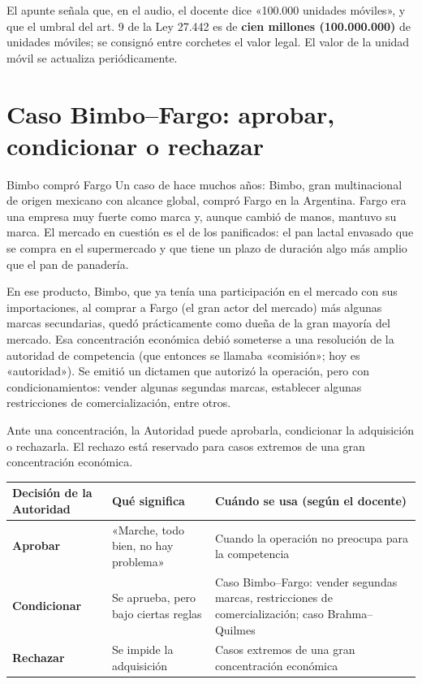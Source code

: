 \documentclass[12pt,oneside]{book}
\begin{document}
\begin{note}
El apunte señala que, en el audio, el docente dice «100.000 unidades móviles», y que el umbral del art. 9 de la Ley 27.442 es de \textbf{cien millones (100.000.000)} de unidades móviles; se consignó entre corchetes el valor legal. El valor de la unidad móvil se actualiza periódicamente.
\end{note}

\section{Caso Bimbo--Fargo: aprobar, condicionar o rechazar}

\begin{example}{Bimbo compró Fargo}
Un caso de hace muchos años: Bimbo, gran multinacional de origen mexicano con alcance global, compró Fargo en la Argentina. Fargo era una empresa muy fuerte como marca y, aunque cambió de manos, mantuvo su marca. El mercado en cuestión es el de los panificados: el pan lactal envasado que se compra en el supermercado y que tiene un plazo de duración algo más amplio que el pan de panadería.

En ese producto, Bimbo, que ya tenía una participación en el mercado con sus importaciones, al comprar a Fargo (el gran actor del mercado) más algunas marcas secundarias, quedó prácticamente como dueña de la gran mayoría del mercado. Esa concentración económica debió someterse a una resolución de la autoridad de competencia (que entonces se llamaba «comisión»; hoy es «autoridad»). Se emitió un dictamen que autorizó la operación, pero con condicionamientos: vender algunas segundas marcas, establecer algunas restricciones de comercialización, entre otros.
\end{example}

Ante una concentración, la Autoridad puede aprobarla, condicionar la adquisición o rechazarla. El rechazo está reservado para casos extremos de una gran concentración económica.

\begin{table}[H]
\centering
\renewcommand{\arraystretch}{1.25}
\begin{tabularx}{\textwidth}{
    >{\raggedright\arraybackslash}p{}
    >{\raggedright\arraybackslash}X
    >{\raggedright\arraybackslash}X
}
\toprule
\textbf{Decisión de la Autoridad} & \textbf{Qué significa} & \textbf{Cuándo se usa (según el docente)} \\
\midrule
\textbf{Aprobar} & «Marche, todo bien, no hay problema» & Cuando la operación no preocupa para la competencia \\
\textbf{Condicionar} & Se aprueba, pero bajo ciertas reglas & Caso Bimbo--Fargo: vender segundas marcas, restricciones de comercialización; caso Brahma--Quilmes \\
\textbf{Rechazar} & Se impide la adquisición & Casos extremos de una gran concentración económica \\
\bottomrule
\end{tabularx}
\end{table}
\end{document}
